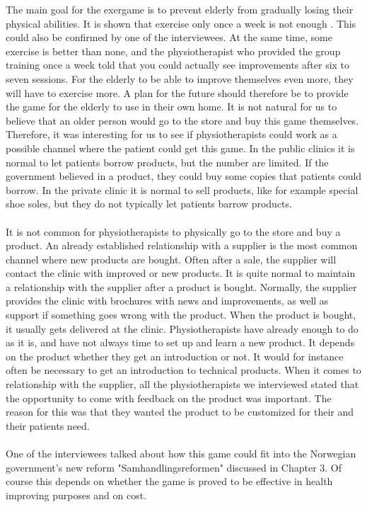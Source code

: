 The main goal for the exergame is to prevent elderly from gradually losing their physical abilities. It is shown that exercise only once a week is not enough \cite{gruppetrening-trheim}. This could also be confirmed by one of the interviewees. At the same time, some exercise is better than none, and the physiotherapist who provided the group training once a week told that you could actually see improvements after six to seven sessions. For the elderly to be able to improve themselves even more, they will have to exercise more. A plan for the future should therefore be to provide the game for the elderly to use in their own home. It is not natural for us to believe that an older person would go to the store and buy this game themselves. Therefore, it was interesting for us to see if physiotherapists could work as a possible channel where the patient could get this game. In the public clinics it is normal to let patients borrow products, but the number are limited.  If the government believed in a product, they could buy some copies that patients could borrow. In the private clinic it is normal to sell products, like for example special shoe soles, but they do not typically let patients barrow products. \\ \\
It is not common for physiotherapists to physically go to the store and buy a product. An already established relationship with a supplier is the most common channel where new products are bought. Often after a sale, the supplier will contact the clinic with improved or new products. It is quite normal to maintain a relationship with the supplier after a product is bought. Normally, the supplier provides the clinic with brochures with news and improvements, as well as support if something goes wrong with the product. When the product is bought, it usually gets delivered at the clinic. Physiotherapists have already enough to do as it is, and have not always time to set up and learn a new product. It depends on the product whether they get an introduction or not. It would for instance often be necessary to get an introduction to technical products. When it comes to relationship with the supplier, all the physiotherapists we interviewed stated that the opportunity to come with feedback on the product was important. The reason for this was that they wanted the product to be customized for their and their patients need. \\ \\
One of the interviewees talked about how this game could fit into the Norwegian government’s new reform "Samhandlingsreformen" discussed in Chapter 3. Of course this depends on whether the game is proved to be effective in health improving purposes and on cost.  \\ \\
